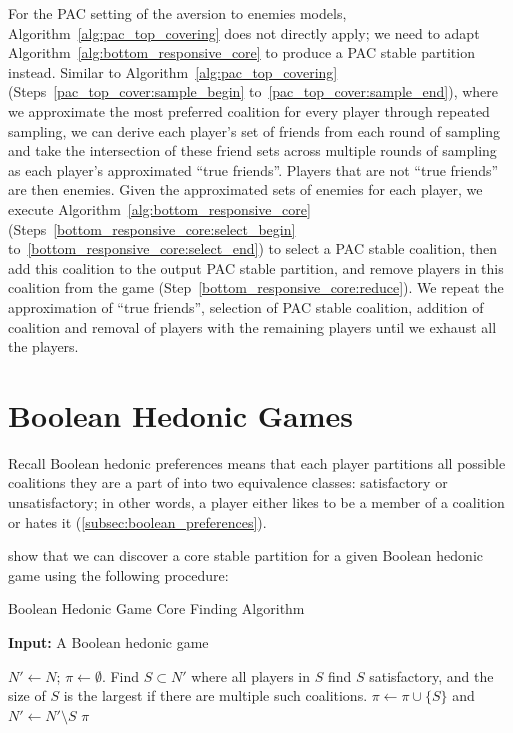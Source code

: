 For the PAC setting of the aversion to enemies models,
Algorithm~\ref{alg:pac_top_covering} does not directly apply; we need to adapt
Algorithm~\ref{alg:bottom_responsive_core} to produce a PAC stable partition
instead.
Similar to Algorithm~\ref{alg:pac_top_covering}
(Steps~\ref{pac_top_cover:sample_begin} to~\ref{pac_top_cover:sample_end}),
where we approximate the most preferred coalition for every player through
repeated sampling, we can derive each player's set of friends from each round
of sampling and take the intersection of these friend sets across multiple rounds
of sampling as each player's approximated ``true friends''.
Players that are not ``true friends'' are then enemies.
Given the approximated sets of enemies for each player, we execute
Algorithm~\ref{alg:bottom_responsive_core}
(Steps~\ref{bottom_responsive_core:select_begin} to~\ref{bottom_responsive_core:select_end}) to select a PAC stable coalition,
then add this coalition to the output PAC stable partition, and remove players
in this coalition from the game (Step~\ref{bottom_responsive_core:reduce}).
We repeat the approximation of ``true friends'', selection of PAC stable
coalition, addition of coalition and removal of players with the remaining
players until we exhaust all the players.


\section{Boolean Hedonic Games}
\label{sec:boolean_hedonic_game}

Recall Boolean hedonic preferences means that each player partitions all possible
coalitions they are a part of into two equivalence classes:
satisfactory or unsatisfactory; in other words, a player either likes to be
a member of a coalition or hates it (\autoref{subsec:boolean_preferences}).

 show that we can discover a core
stable partition for a given Boolean hedonic game using the following procedure:

\begin{algorithm}[htb]
  \caption{Boolean Hedonic Game Core Finding Algorithm}
  \label{alg:boolean_core}
  \textbf{Input:} A Boolean hedonic game
  \begin{algorithmic}[1]

  \State $N' \leftarrow N$; $\pi \leftarrow \emptyset$.
    \State \label{boolean_core:select} Find $S \subset N'$ where all players
      in $S$ find $S$ satisfactory, and the size of $S$ is the largest if there
      are multiple such coalitions.
    \State $\pi \leftarrow \pi \cup \lbrace S \rbrace$ and
      $N' \leftarrow  N' \setminus S$
  \EndWhile
  \State \Return $\pi$

  \end{algorithmic}
\end{algorithm}


